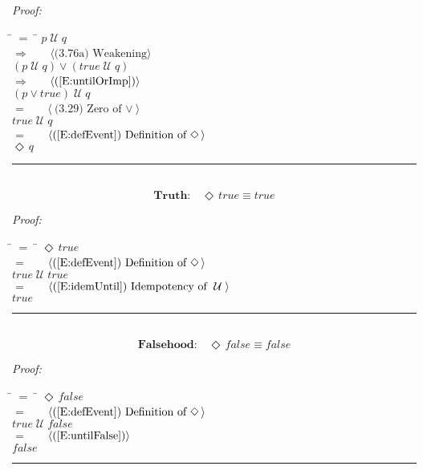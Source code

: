 \documentclass[fleqn, leqno]{article}
\newcommand{\lgap}{2pt} %
\newcommand{\mymathindent}{24pt} %
\newcommand{\Until}{\;\mathcal{U}\;}
\newcommand{\Event}{\Diamond\,}
\newcommand{\myqed}{\hfill\rule[-.23ex]{1.2ex}{2.0ex}}
\newcommand{\Gll} {\langle} %
\newcommand{\Ggg} {\rangle} %
\newcommand{\Hint}[1] {\ \ \ $\Gll \mbox{#1} \Ggg$ } %
\begin{document}
\emph{Proof:}
\begin{tabbing}
\hspace{\mymathindent} \= $= \;$ \= \kill
\> \> $p \Until q$\\[\lgap]
\> $\Rightarrow$ \> \Hint{(3.76a) Weakening}\\[\lgap]
\> \> $(p \Until q) \lor (true \Until q)$\\[\lgap]
\> $\Rightarrow$ \> \Hint{(\ref{E:untilOrImp})}\\[\lgap]
\> \> $(p \lor true) \Until q$\\[\lgap]
\> $=$ \> \Hint{(3.29) Zero of $\lor$}\\[\lgap]
\> \> $true \Until q$\\[\lgap]
\> $=$ \> \Hint{(\ref{E:defEvent}) Definition of $\Event$}\\[\lgap]
\> \> $\Event q$\\[\lgap]
\end{tabbing}
\myqed\\[\lgap]


\begin{equation}\label{E:eventTrue}
\textbf{Truth:}\quad \Event true \equiv true
\end{equation}

\emph{Proof:}
\begin{tabbing}
\hspace{\mymathindent} \= $= \;$ \= \kill
\> \> $\Event true$\\[\lgap]
\> $=$ \> \Hint{(\ref{E:defEvent}) Definition of $\Event$}\\[\lgap]
\> \> $true \Until true$\\[\lgap]
\> $=$ \> \Hint{(\ref{E:idemUntil}) Idempotency of $\Until$}\\[\lgap]
\> \> $true$\\[\lgap]
\end{tabbing}
\myqed\\[\lgap]


\begin{equation}\label{E:eventFalse}
\textbf{Falsehood:}\quad \Event false \equiv false
\end{equation}

\emph{Proof:}
\begin{tabbing}
\hspace{\mymathindent} \= $= \;$ \= \kill
\> \> $\Event false$\\[\lgap]
\> $=$ \> \Hint{(\ref{E:defEvent}) Definition of $\Event$}\\[\lgap]
\> \> $true \Until false$\\[\lgap]
\> $=$ \> \Hint{(\ref{E:untilFalse})}\\[\lgap]
\> \> $false$\\[\lgap]
\end{tabbing}
\myqed\\[\lgap]
\end{document}

